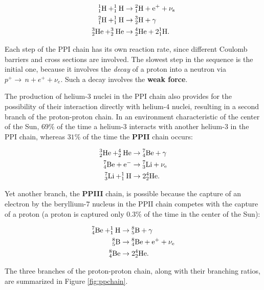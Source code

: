 \documentclass[a4paper,10pt]{article}
\begin{document}
\begin{align*}
    {\rm ^1_1H + ^1_1H} &\rightarrow {\rm ^2_1H + e^+ + \nu_s} \\
    {\rm ^2_1H + ^1_1H} &\rightarrow {\rm ^3_2H + \gamma} \\
    {\rm ^3_2He + ^3_2He} &\rightarrow {\rm ^4_2He + 2^1_1H}.
\end{align*}

{\noindent}Each step of the PPI chain has its own reaction rate, since different Coulomb barriers and cross sections are involved. The slowest step in the sequence is the initial one, because it involves the \textit{decay} of a proton into a neutron via $p^+\rightarrow\,n+e^++\nu_e$. Such a decay involves the \textbf{weak force}.

{\noindent}The production of helium-$3$ nuclei in the PPI chain also provides for the possibility of their interaction directly with helium-$4$ nuclei, resulting in a second branch of the proton-proton chain. In an environment characteristic of the center of the Sun, $69\%$ of the time a helium-$3$ interacts with another helium-$3$ in the PPI chain, whereas $31\%$ of the time the \textbf{PPII} chain occurs:

\begin{align*}
    {\rm ^3_2He + ^4_2He} &\rightarrow {\rm ^7_4Be + \gamma} \\
    {\rm ^7_4Be + e^-} &\rightarrow {\rm ^7_3Li + \nu_e} \\
    {\rm ^7_3Li + ^1_1H} &\rightarrow {\rm 2^4_2He}.
\end{align*}

{\noindent}Yet another branch, the \textbf{PPIII} chain, is possible because the capture of an electron by the beryllium-$7$ nucleus in the PPII chain competes with the capture of a proton (a proton is captured only $0.3\%$ of the time in the center of the Sun):

\begin{align*}
    {\rm ^7_4Be + ^1_1H} &\rightarrow {\rm ^8_5B + \gamma} \\
    {\rm ^8_5B} &\rightarrow {\rm ^8_4Be + e^+ + \nu_e} \\
    {\rm ^8_4Be} &\rightarrow {\rm 2^4_2He}.
\end{align*}

{\noindent}The three branches of the proton-proton chain, along with their branching ratios, are summarized in Figure \ref{fig:ppchain}.
\end{document}
